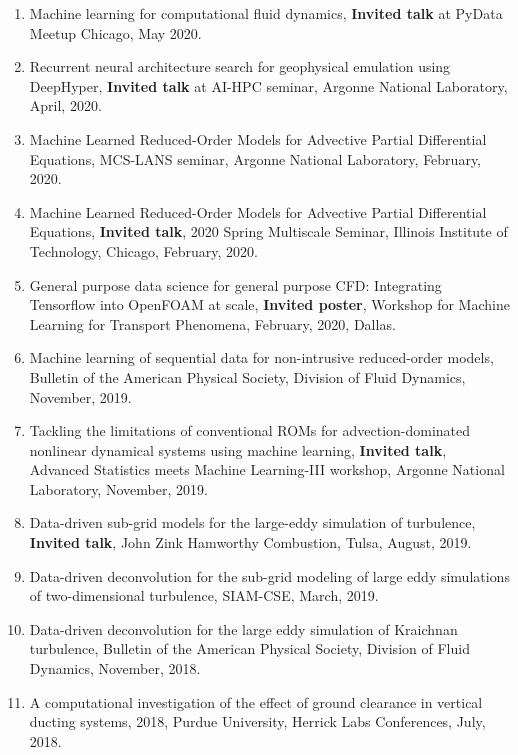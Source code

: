 \documentclass[letterpaper]{article}
\begin{document}
\begin{enumerate}
\item Machine learning for computational fluid dynamics, \textbf{Invited talk} at PyData Meetup Chicago, May 2020.

\item Recurrent neural architecture search for geophysical emulation using DeepHyper, \textbf{Invited talk} at AI-HPC seminar, Argonne National Laboratory, April, 2020.

\item Machine Learned Reduced-Order Models for Advective Partial Differential Equations, MCS-LANS seminar, Argonne National Laboratory, February, 2020.

\item Machine Learned Reduced-Order Models for Advective Partial Differential Equations, \textbf{Invited talk}, 2020 Spring Multiscale Seminar, Illinois Institute of Technology, Chicago, February, 2020.

\item General purpose data science for general purpose CFD: Integrating Tensorflow into OpenFOAM at scale, \textbf{Invited poster}, Workshop for Machine Learning for Transport Phenomena, February, 2020, Dallas.

\item Machine learning of sequential data for non-intrusive reduced-order models, Bulletin of the American Physical Society, Division of Fluid Dynamics, November, 2019.

\item Tackling the limitations of conventional ROMs for advection-dominated nonlinear dynamical systems using machine learning, \textbf{Invited talk}, Advanced Statistics meets Machine Learning-III workshop, Argonne National Laboratory, November, 2019.

\item Data-driven sub-grid models for the large-eddy simulation of turbulence, \textbf{Invited talk}, John Zink Hamworthy Combustion, Tulsa, August, 2019.

\item Data-driven deconvolution for the sub-grid modeling of large eddy simulations of two-dimensional turbulence, SIAM-CSE, March, 2019.

\item Data-driven deconvolution for the large eddy simulation of Kraichnan turbulence, Bulletin of the American Physical Society, Division of Fluid Dynamics, November, 2018.

\item A computational investigation of the effect of ground clearance in vertical ducting systems, 2018, Purdue University, Herrick Labs Conferences, July, 2018. 


\end{enumerate}
\end{document}
